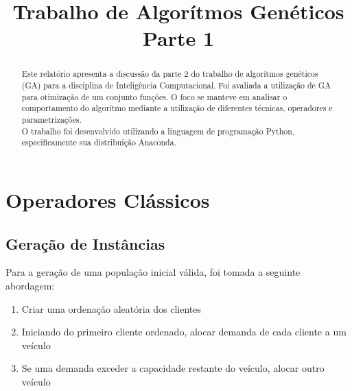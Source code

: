 \documentclass[conference]{IEEEtran}
\begin{document}
\title{Trabalho de Algorítmos Genéticos\\ Parte 1}


\author{
}

\maketitle

\begin{abstract}
Este relatório apresenta a discussão da parte 2  do trabalho de algorítmos
genéticos (GA) para a disciplina de Inteligência Computacional. Foi avaliada a
utilização de GA para otimização de um conjunto funções. O foco se manteve em
analisar o comportamento do algorítmo mediante a utilização de
diferentes técnicas, operadores e parametrizações.\\
O trabalho foi desenvolvido utilizando a linguagem de programação Python,
especificamente sua distribuição Anaconda.\\
\end{abstract}



\section{Operadores Clássicos}



\subsection{Geração de Instâncias}
Para a geração de uma população inicial válida, foi tomada a seguinte abordagem:
\begin{enumerate}
\item Criar uma ordenação aleatória dos clientes
\item Iniciando do primeiro cliente ordenado, alocar demanda de cada cliente a um veículo
\item Se uma demanda exceder a capacidade restante do veículo, alocar outro veículo
\end{enumerate}
\end{document}
